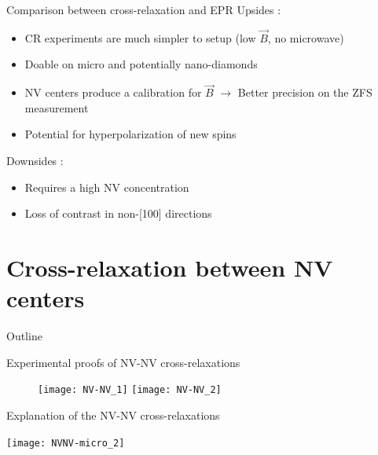 \documentclass{beamer}
\begin{document}
\begin{frame}{Comparison between cross-relaxation and EPR}
\pause
Upsides :
\begin{itemize}
\item CR experiments are much simpler to setup (low $\vec B$, no microwave)
\pause
\item Doable on micro and potentially nano-diamonds
\pause
\item NV centers produce a calibration for $\vec B$ $\to$ Better precision on the ZFS measurement
\pause
\item Potential for hyperpolarization of new spins
\pause
\end{itemize}
Downsides :
\begin{itemize}
\item Requires a high NV concentration
\pause
\item Loss of contrast in non-[100] directions
\end{itemize}
\end{frame}
\section{Cross-relaxation between NV centers}
\begin{frame}{Outline}
\tableofcontents[currentsection]
\end{frame}
\begin{frame}{Experimental proofs of NV-NV cross-relaxations}
\begin{figure}
    \begin{overprint}
    \texttt{[image: NV-NV\_1]}
    \texttt{[image: NV-NV\_2]}
    \end{overprint}
\end{figure}
\end{frame}
\begin{frame}{Explanation of the NV-NV cross-relaxations}





\pause
\centering
\texttt{[image: NVNV-micro\_2]}
\end{frame}
\end{document}
